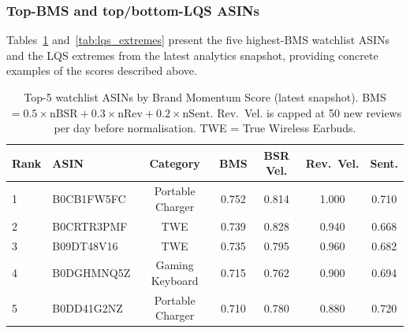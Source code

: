 \subsubsection*{Top-BMS and top/bottom-LQS ASINs}

Tables~\ref{tab:bms_top5} and~\ref{tab:lqs_extremes} present the five highest-BMS
watchlist ASINs and the LQS extremes from the latest analytics snapshot, providing
concrete examples of the scores described above.

\begin{table}[H]
  \centering
  \small
  \begin{tabular}{llccccc}
    \toprule
    \textbf{Rank} & \textbf{ASIN} & \textbf{Category} & \textbf{BMS} & \textbf{BSR Vel.} & \textbf{Rev.\ Vel.} & \textbf{Sent.} \\
    \midrule
    1 & B0CB1FW5FC  & Portable Charger   & 0.752 & 0.814 & 1.000 & 0.710 \\
    2 & B0CRTR3PMF  & TWE                & 0.739 & 0.828 & 0.940 & 0.668 \\
    3 & B09DT48V16  & TWE                & 0.735 & 0.795 & 0.960 & 0.682 \\
    4 & B0DGHMNQ5Z  & Gaming Keyboard    & 0.715 & 0.762 & 0.900 & 0.694 \\
    5 & B0DD41G2NZ  & Portable Charger   & 0.710 & 0.780 & 0.880 & 0.720 \\
    \bottomrule
  \end{tabular}
  \caption{Top-5 watchlist ASINs by Brand Momentum Score (latest snapshot). BMS $= 0.5 \times \text{nBSR} + 0.3 \times \text{nRev} + 0.2 \times \text{nSent}$. Rev.\ Vel. is capped at 50 new reviews per day before normalisation. TWE = True Wireless Earbuds.}
  \label{tab:bms_top5}
\end{table}

